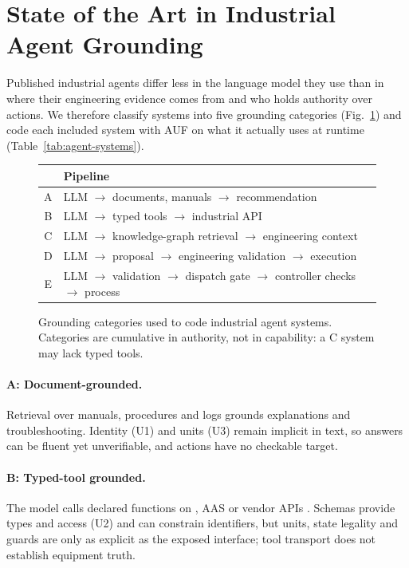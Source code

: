 \section{State of the Art in Industrial Agent Grounding}
\label{sec:agents}

Published industrial agents differ less in the language model they use than in where their
engineering evidence comes from and who holds authority over actions. We therefore classify
systems into five grounding categories (Fig.~\ref{fig:categories}) and code each included
system with AUF on what it actually uses at runtime (Table~\ref{tab:agent-systems}).

\begin{figure}[t]
\centering\footnotesize
\setlength{\tabcolsep}{2pt}
\begin{tabular}{@{}cl@{}}
\toprule
& Pipeline \\
\midrule
A & LLM $\rightarrow$ documents, manuals $\rightarrow$ recommendation \\
B & LLM $\rightarrow$ typed tools $\rightarrow$ industrial API \\
C & LLM $\rightarrow$ knowledge-graph retrieval $\rightarrow$ engineering context \\
D & LLM $\rightarrow$ proposal $\rightarrow$ engineering validation $\rightarrow$ execution \\
E & LLM $\rightarrow$ validation $\rightarrow$ dispatch gate $\rightarrow$ controller checks $\rightarrow$ process \\
\bottomrule
\end{tabular}
\caption{Grounding categories used to code industrial agent systems. Categories are cumulative
in authority, not in capability: a C system may lack typed tools.}
\label{fig:categories}
\end{figure}

\paragraph{A: Document-grounded.} Retrieval over manuals, procedures and logs
\cite{lewis2020rag} grounds explanations and troubleshooting. Identity (U1) and units (U3)
remain implicit in text, so answers can be fluent yet unverifiable, and actions have no
checkable target.

\paragraph{B: Typed-tool grounded.} The model calls declared functions on \opcua{}, AAS or
vendor APIs \cite{schick2023toolformer,yao2023react,patil2024gorilla,mcp}. Schemas provide
types and access (U2) and can constrain identifiers, but units, state legality and guards
are only as explicit as the exposed interface; tool transport does not establish equipment
truth.

